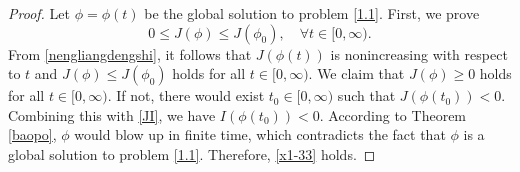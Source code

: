 \documentclass[10pt,a4paper]{amsart}
\begin{document}
\begin{proof}
Let $\phi=\phi(t)$ be the global solution to problem \eqref{1.1}.
First, we prove
\begin{equation}\label{x1-33}
0\leq J(\phi)\leq J(\phi_0),\quad \forall t\in[0,\infty).
\end{equation}
From \eqref{nengliangdengshi}, it follows that $J(\phi(t))$ is nonincreasing with respect to $t$ and $J(\phi)\leq J(\phi_0)$ holds for all $t\in[0,\infty)$. We claim that $J(\phi)\geq 0$ holds for all $t\in[0,\infty)$. If not, there would exist $t_0\in[0,\infty)$ such that $J(\phi(t_0))<0$. Combining this with \eqref{JI}, we have $I(\phi(t_0))<0$. According to Theorem \ref{baopo}, $\phi$ would blow up in finite time, which contradicts the fact that $\phi$ is a global solution to problem \eqref{1.1}. Therefore, \eqref{x1-33} holds.


\end{proof}
\end{document}
